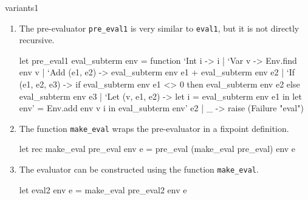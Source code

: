 \begin{exercise}{variants1}
\begin{answer}
\begin{enumerate}
\item

The pre-evaluator \lstinline$pre_eval1$ is very similar
to \hbox{\lstinline$eval1$}, but it is not directly recursive.

\begin{ocaml}
let pre_eval1 eval_subterm env = function
   `Int i -> i
 | `Var v -> Env.find env v
 | `Add (e1, e2) ->
      eval_subterm env e1 + eval_subterm env e2
 | `If (e1, e2, e3) ->
      if eval_subterm env e1 <> 0
      then eval_subterm env e2
      else eval_subterm env e3
 | `Let (v, e1, e2) ->
      let i = eval_subterm env e1 in
      let env' = Env.add env v i in
      eval_subterm env' e2
 | _ ->
      raise (Failure "eval")
\end{ocaml}

\item

The function \lstinline$make_eval$ wraps the pre-evaluator in a
fixpoint definition.

\begin{ocaml}
let rec make_eval pre_eval env e =
   pre_eval (make_eval pre_eval) env e
\end{ocaml}

\item

The evaluator can be constructed using the function \lstinline$make_eval$.

\begin{ocaml}
let eval2 env e = make_eval pre_eval2 env e
\end{ocaml}
\end{enumerate}
\fi\end{answer}
\end{exercise}

